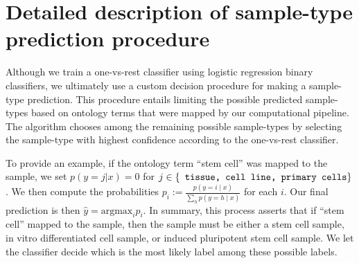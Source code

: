 \section{Detailed description of sample-type prediction procedure } \label{sec:sample_pred}

Although we train a one-vs-rest classifier using logistic regression binary classifiers, we ultimately use a custom decision procedure for making a sample-type prediction.  This procedure entails limiting the possible predicted sample-types based on ontology terms that were mapped by our computational pipeline.  The algorithm chooses among the remaining possible sample-types by selecting the sample-type with highest confidence according to the one-vs-rest classifier.    

To provide an example, if the ontology term ``stem cell'' was mapped to the sample, we set $p(y = j | x) = 0$ for $j \in \{\text{\texttt{ tissue, cell line, primary cells}}\}$.  We then compute the probabilities $p_i := \frac{p(y=i \mid x)}{\sum_h p(y = h \mid x)}$ for each $i$.  Our final prediction is then $\hat{y} = \text{argmax}_i p_i$. In summary, this process asserts that if ``stem cell'' mapped to the sample, then the sample must be either a stem cell sample, in vitro differentiated cell sample, or induced pluripotent stem cell sample. We let the classifier decide which is the most likely label among these possible labels. 

